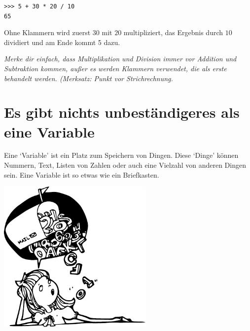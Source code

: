 \begin{Verbatim}[frame=single]
>>> 5 + 30 * 20 / 10
65
\end{Verbatim}

Ohne Klammern wird zuerst $30$ mit $20$ multipliziert, das Ergebnis durch $10$ dividiert und am Ende kommt 5 dazu.

\emph{Merke dir einfach, dass Multiplikation und Division immer vor Addition und Subtraktion kommen, außer es werden Klammern verwendet, die als erste behandelt werden. (Merksatz: Punkt vor Strichrechnung.}

\section{Es gibt nichts unbeständigeres als eine Variable}

Eine `Variable' ist ein Platz zum Speichern von Dingen. Diese `Dinge' können Nummern, Text, Listen von Zahlen oder auch eine Vielzahl von anderen Dingen sein. Eine Variable ist so etwas wie ein Briefkasten.

\begin{center}
\includegraphics*[width=76mm]{images/girlbubble}
\end{center}

